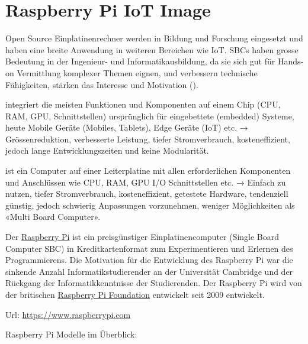 \documentclass[
  11pt,
  a4paperpaper,
  oneside, openany  ,captions=tableheading
]{scrbook}
\providecommand{\tightlist}{%
  \setlength{\itemsep}{0pt}\setlength{\parskip}{0pt}}
\theoremstyle{definition}
\theoremstyle{remark}
\begin{document}
\cleardoublepage
{}
{}
\appendix

\chapter{Raspberry Pi IoT Image}\label{raspberry-pi-iot-image}

Open Source Einplatinenrechner werden in Bildung und Forschung
eingesetzt und haben eine breite Anwendung in weiteren Bereichen wie
IoT. SBCs haben grosse Bedeutung in der Ingenieur- und
Informatikausbildung, da sie sich gut für Hands-on Vermittlung komplexer
Themen eignen, und verbessern technische Fähigkeiten, stärken das
Interesse und Motivation ().

\begin{description}
\tightlist
\item[System on Chip SOC \index{System on Chip SOC}]
integriert die meisten Funktionen und Komponenten auf einem Chip (CPU,
RAM, GPU, Schnittstellen) ursprünglich für eingebettete (embedded)
Systeme, heute Mobile Geräte (Mobiles, Tablets), Edge Geräte (IoT) etc.
→ Grössenreduktion, verbesserte Leistung, tiefer Stromverbrauch,
kosteneffizient, jedoch lange Entwicklungszeiten und keine Modularität.
\item[Single Board Computer SBC \index{Single Board Computer SBC}]
ist ein Computer auf einer Leiterplatine mit allen erforderlichen
Komponenten und Anschlüssen wie CPU, RAM, GPU I/O Schnittstellen etc. →
Einfach zu nutzen, tiefer Stromverbrauch, kosteneffizient, getestete
Hardware, tendenziell günstig, jedoch schwierig Anpassungen vorzunehmen,
weniger Möglichkeiten als «Multi Board Computer».
\end{description}

Der \href{https://www.raspberrypi.com}{Raspberry Pi}
ist ein preisgünstiger Einplatinencomputer (Single Board Computer SBC)
in Kreditkartenformat zum Experimentieren und Erlernen des
Programmierens. Die Motivation für die Entwicklung des Raspberry Pi war
die sinkende Anzahl Informatikstudierender an der Universität Cambridge
und der Rückgang der Informatikkenntnisse der Studierenden. Der
Raspberry Pi wird von der britischen
\href{https://www.raspberrypi.org}{Raspberry Pi Foundation} entwickelt
seit 2009 entwickelt.

Url: \url{https://www.raspberrypi.com}

Raspberry Pi Modelle im Überblick:
\end{document}
